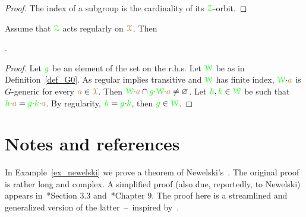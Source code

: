 \begin{proof}
  The index of a subgroup is the cardinality of its ${\color{green}\EuScript Z}$-orbit. 
\end{proof}

\begin{proposition}\label{prop_Z0_inclusione}
  Assume that ${\color{green}\EuScript Z}$ acts regularly on ${\color{brown}\EuScript X}$.
  Then
  

  .
 
\end{proposition}


\begin{proof}
  Let ${\color{green} g}$ be an element of the set on the r.h.s.
  Let ${\color{green}\EuScript W}$ be as in Definition~\ref{def_G0}.
  As regular implies transitive and ${\color{green}\EuScript W}$ has finite index, ${\color{green}\EuScript W}{\cdot}{\color{brown} a}$ is $G$-generic for every ${\color{brown} a}\in{\color{brown}\EuScript X}$.
  Then ${\color{green}\EuScript W}{\cdot}{\color{brown} a}\cap{\color{green}g}{\cdot}{\color{green}\EuScript W}{\cdot}{\color{brown}a}\neq\varnothing$.
  Let ${\color{green} h},{\color{green} k}\in{\color{green}\EuScript W}$ be such that ${\color{green} h}{\cdot}{\color{brown} a}={\color{green} g}{\cdot}{\color{green} k}{\cdot}{\color{brown} a}$.
  By regularity, ${\color{green} h}={\color{green} g}{\cdot}{\color{green} k}$, then ${\color{green} g}\in{\color{green}\EuScript W}$.
 \end{proof}

\section{Notes and references}

In Example~\ref{ex_newelski} we prove a theorem of Newelski's~\cite{Newelski}.
The original proof is rather long and complex.
A simplified proof (also due, reportedly, to Newelski) appears in~\cite{Pelaez}*{Section 3.3} and~\cite{Casanovas}*{Chapter 9}.
The proof here is a streamlined and generalized version of the latter~--~inspired by~\cite{Z16}.

